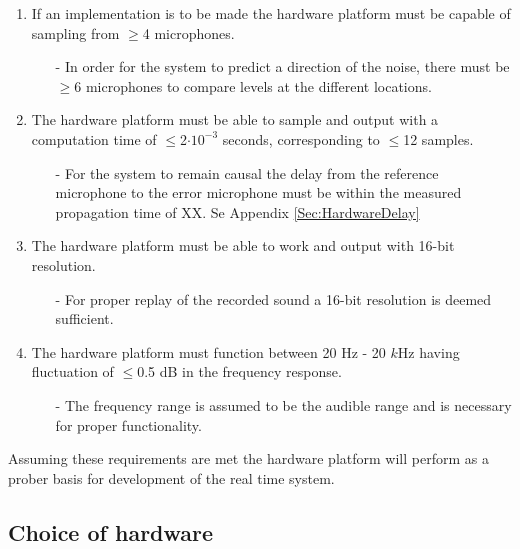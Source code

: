 \begin{enumerate}
	
	\item If an implementation is to be made the hardware platform must be capable of sampling from $\geq$4 microphones.\label{Req:NoOfMic}
	\begin{itemize}
		\item[-]In order for the system to predict a direction of the noise, there must be $\geq$6 microphones to compare levels at the different locations.
	\end{itemize}
	
	\item The hardware platform must be able to sample and output with a computation time of $\leq$2$\cdot 10 ^{-3}$ seconds, corresponding to $\leq$12 samples.\label{Req:NoOfSamples}
	\begin{itemize}
		\item[-]For the system to remain causal the delay from the reference microphone to the error microphone must be within the measured propagation time of XX. Se Appendix \autoref{Sec:HardwareDelay}
	\end{itemize}
	
	\item The hardware platform must be able to work and output with 16-bit resolution.\label{Req:DSPResolution}
	\begin{itemize}
		\item[-] For proper replay of the recorded sound a 16-bit resolution is deemed sufficient. 
	\end{itemize}
	
	\item The hardware platform must function between 20 Hz - 20 $k$Hz having fluctuation of $\leq$0.5 dB in the frequency response.\label{Req:DSPFrequencyArea}
	\begin{itemize}
		\item[-] The frequency range is assumed to be the audible range and is necessary for proper functionality.
	\end{itemize}
\end{enumerate} 

Assuming these requirements are met the hardware platform will perform as a prober basis for development of the real time system.

\subsection{Choice of hardware}\label{subsec:ChoiceOfHardware}

